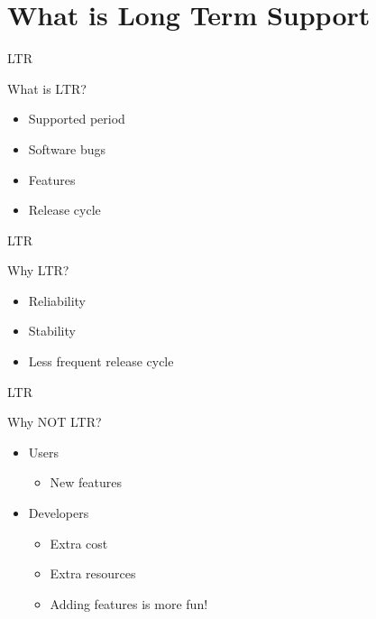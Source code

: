 \section{What is Long Term Support}

\begin{frame}{LTR}
	\begin{block}{What is LTR?}
		\begin{itemize}
			\item Supported period
			\item Software bugs 
			\item Features
			\item Release cycle
		\end{itemize}
	\end{block}
\end{frame}

\begin{frame}{LTR}
	\begin{block}{Why LTR?}
		\begin{itemize}
			\item Reliability
			\item Stability
			\item Less frequent release cycle 
		\end{itemize}
	\end{block}
\end{frame}

\begin{frame}{LTR}
	\begin{block}{Why NOT LTR?}
		\begin{itemize}
			\item Users
				\begin{itemize}
					\item New features
				\end{itemize}		
			\item Developers 
				\begin{itemize}
					\item Extra cost
					\item Extra resources
					\item Adding features is more fun!
				\end{itemize}
		\end{itemize}
	\end{block}
\end{frame}

